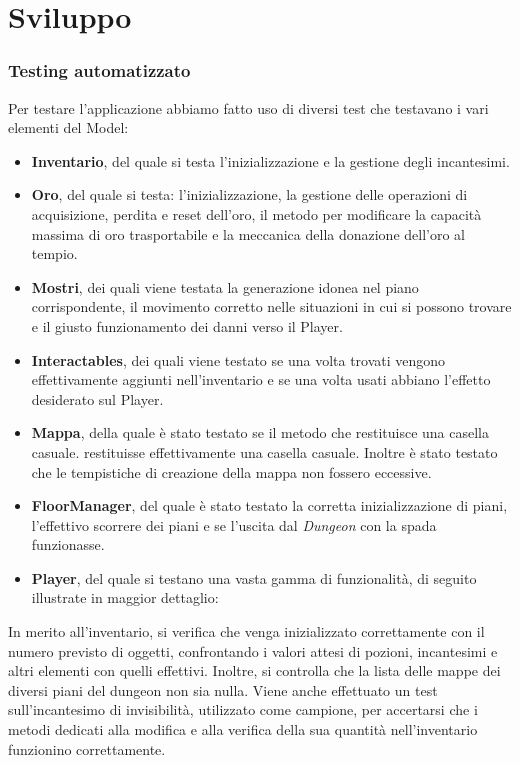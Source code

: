 \documentclass{report}
\begin{document}
\chapter{Sviluppo}

\subsection{Testing automatizzato}
Per testare l'applicazione abbiamo fatto uso di diversi test che testavano i vari elementi del Model:
\begin{itemize}
    \item \textbf{Inventario}, del quale si testa l’inizializzazione e la gestione degli incantesimi.
    \item \textbf{Oro}, del quale si testa: l’inizializzazione, la gestione delle operazioni di acquisizione, perdita e reset dell’oro, il metodo per modificare la capacità massima di oro trasportabile e la meccanica della donazione dell’oro al tempio.
    \item \textbf{Mostri}, dei quali viene testata la generazione idonea nel piano corrispondente, il movimento corretto nelle situazioni in cui si possono trovare e il giusto funzionamento dei danni verso il Player.
    \item \textbf{Interactables}, dei quali viene testato se una volta trovati vengono effettivamente aggiunti nell'inventario e se una volta usati abbiano l'effetto desiderato sul Player.
    \item \textbf{Mappa}, della quale è stato testato se il metodo che restituisce una casella casuale. restituisse effettivamente una casella casuale. Inoltre è stato testato che le tempistiche di creazione della mappa non fossero eccessive.
    \item \textbf{FloorManager}, del quale è stato testato la corretta inizializzazione di piani, l'effettivo scorrere dei piani e se l'uscita dal \textit{Dungeon} con la spada funzionasse.
    \item \textbf{Player}, del quale si testano una vasta gamma di funzionalità, di seguito illustrate in maggior dettaglio:
\end{itemize} 
%
In merito all'inventario, si verifica che venga inizializzato correttamente con il numero previsto di oggetti, confrontando i valori attesi di pozioni, incantesimi e altri elementi con quelli effettivi. Inoltre, si controlla che 
%
la lista delle mappe dei diversi piani del dungeon non sia nulla. \newline
%
Viene anche effettuato un test sull’incantesimo di invisibilità, utilizzato come campione, per accertarsi che i metodi dedicati alla modifica e alla verifica della sua quantità nell’inventario funzionino correttamente. \newline
\end{document}
